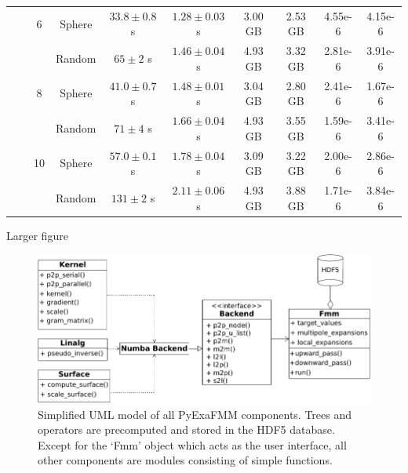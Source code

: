 \documentclass{IEEEcsmag}
\begin{document}
\begin{table}
\begin{tabular}{|*{10}{c|}}
		&  & 6   &   Sphere  &    $33.8 \pm 0.8$ s & $1.28 \pm 0.03$ s &  3.00 GB  &  2.53 GB  & 4.55e-6 & 4.15e-6\\
		 &  &   &   Random  &  $65 \pm 2$ s &    $1.46 \pm 0.04$ s  &  4.93 GB  &   3.32 GB  & 2.81e-6 & 3.91e-6\\
		 &  & 8   &   Sphere  &  $41.0 \pm 0.7$ s &   $1.48 \pm 0.01$ s  &  3.04 GB  &   2.80 GB  & 2.41e-6 & 1.67e-6\\
		 &  &    &   Random  &  $71 \pm 4$ s &   $1.66 \pm 0.04$ s  &  4.93 GB  &   3.55 GB  & 1.59e-6 & 3.41e-6\\
		 &  & 10   &   Sphere  &  $57.0 \pm 0.1$ s &  $1.78 \pm 0.04$ s  &  3.09 GB  &   3.22 GB  & 2.00e-6 & 2.86e-6\\
		 &  &    &   Random  & $131 \pm 2$ s &   $2.11 \pm 0.06$ s  &  4.93 GB  &   3.88 GB  & 1.71e-6 & 3.84e-6\\
		\hline
	\end{tabular}
	\label{tab:performance}
 \end{table}

Larger figure
\begin{figure}
	\centerline{\includegraphics {figures/software.pdf}}
	\caption{Simplified UML model of all PyExaFMM components. Trees and operators are precomputed and stored in the HDF5 database. Except for the `Fmm' object which acts as the user interface, all other components are modules consisting of simple functions.}
	\label{fig:design}
\end{figure}
\end{document}
